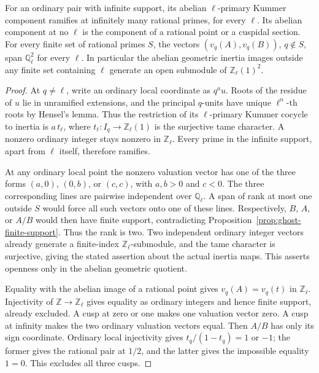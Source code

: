 \begin{proposition}
\label{prop:ghost-infinite-ramification}
For an ordinary pair with infinite support, its abelian
\(\ell\)-primary Kummer component ramifies at infinitely many
rational primes, for every \(\ell\). Its abelian component at
no \(\ell\) is the component of a rational point or a cuspidal
section.
For every finite set of rational primes \(S\), the vectors
\((v_q(A),v_q(B))\), \(q\notin S\), span
\(\mathbb Q_\ell^2\) for every \(\ell\). In particular the
abelian geometric inertia images outside any finite set
containing \(\ell\) generate an open submodule of
\(\mathbb Z_\ell(1)^2\).
\end{proposition}
\begin{proof}
At \(q\ne\ell\), write an ordinary local coordinate as
\(q^a u\). Roots of the residue of \(u\) lie in unramified
extensions, and the principal \(q\)-units have unique
\(\ell^n\)-th roots by Hensel's lemma. Thus the restriction of
its \(\ell\)-primary Kummer cocycle to inertia is
\(a\,t_\ell\), where \(t_\ell:I_q\to\mathbb Z_\ell(1)\)
is the surjective tame character. A nonzero ordinary integer stays
nonzero in \(\mathbb Z_\ell\). Every prime in the infinite
support, apart from \(\ell\) itself, therefore ramifies.

At any ordinary local point the nonzero valuation vector has
one of the three forms \((a,0)\), \((0,b)\), or \((c,c)\),
with \(a,b>0\) and \(c<0\). The three corresponding lines
are pairwise independent over \(\mathbb Q_\ell\). A span of
rank at most one outside \(S\) would force all such vectors
onto one of these lines. Respectively, \(B\), \(A\), or
\(A/B\) would then have finite support, contradicting
Proposition~\ref{prop:ghost-finite-support}. Thus the rank is
two. Two independent ordinary integer vectors already generate
a finite-index \(\mathbb Z_\ell\)-submodule, and the tame
character is surjective, giving the stated assertion about the
actual inertia maps. This asserts openness only in the abelian
geometric quotient.

Equality with the abelian image of a rational point gives
\(v_q(A)=v_q(t)\) in \(\mathbb Z_\ell\). Injectivity of
\(\mathbb Z\to\mathbb Z_\ell\) gives equality as ordinary
integers and hence finite support, already excluded. A cusp at
zero or one makes one valuation vector zero. A cusp at infinity
makes the two ordinary valuation vectors equal. Then \(A/B\)
has only its sign coordinate. Ordinary local injectivity gives
\(t_q/(1-t_q)=1\) or \(-1\); the former gives the rational pair
at \(1/2\), and the latter gives the impossible equality
\(1=0\). This excludes all three cusps.
\end{proof}

